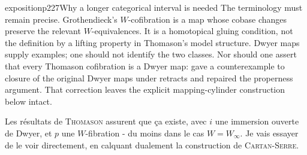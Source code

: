 \begin{dcomment}{exposition}{p227}{Why a longer categorical interval is needed}
The terminology must remain precise. Grothendieck's $W$-cofibration is a map whose cobase changes preserve the relevant $W$-equivalences. It is a homotopical gluing condition, not the definition by a lifting property in Thomason's model structure. Dwyer maps supply examples; one should not identify the two classes. Nor should one assert that every Thomason cofibration is a Dwyer map: \citet[pp.~227--231]{Cisinski1999Dwyer} gave a counterexample to closure of the original Dwyer maps under retracts and repaired the properness argument. That correction leaves the explicit mapping-cylinder construction below intact.
\end{dcomment}


Les résultats de \textsc{Thomason} assurent que ça existe, avec $i$ une immersion ouverte de Dwyer, et $p$ une $W$-fibration - du moins dans le cas $W = W_\infty$. Je vais essayer de le voir directement, en calquant dualement la construction de \textsc{Cartan-Serre}.

